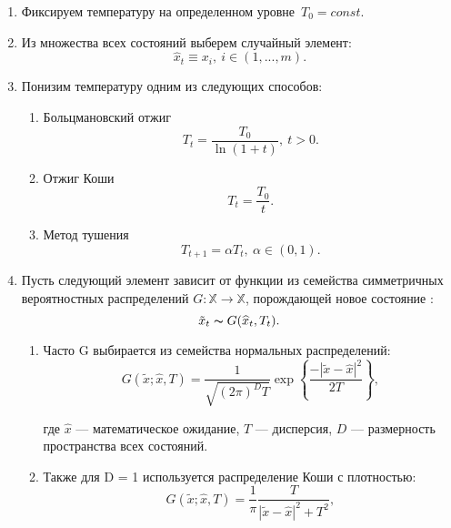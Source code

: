 \begin{enumerate}
	\item Фиксируем температуру на определенном уровне~$T_0 = const$.

	\item  Из множества всех состояний выберем случайный элемент:
	\[
		\widehat{x}_t \equiv x_i,\ i \in (1, ..., m).
	\]

	\item Понизим температуру одним из следующих способов:

		\begin{enumerate}
			\item Больцмановский отжиг
			\begin{equation}
			T_t = \dfrac{T_0}{\ln (1 + t)}, \ t > 0.
			\label{eq:boltzman}
			\end{equation}

			\item Отжиг Коши
			\begin{equation}
			T_t  =  \dfrac{T_0}{t}.
			\end{equation}

			\item Метод тушения
			\begin{equation}
			T_{t + 1} = \alpha T_t,\ \alpha \in (0, 1).
			\label{eq:tushenie}
			\end{equation}

		\end{enumerate}


	\item Пусть следующий элемент зависит от функции из семейства симметричных вероятностных распределений $G \colon \mathbb{X} \to \mathbb{X}$, порождающей новое состояние \cite{Lopatin}:
	\[
	\tilde{x}_t \thicksim G(\widehat{x}_t, T_t).
	\]

	\begin{enumerate}

		\item Часто G выбирается из семейства нормальных распределений:
		\begin{equation}
		\label{eq:normal_G}
		G(\tilde{x}; \widehat{x}, T)
		=
		\dfrac{1}
		{\sqrt{(2\pi)^{D} T}}
		\exp
		\left\lbrace
		\dfrac{- |\tilde{x} - \widehat{x}|^2}{2T}
		\right\rbrace,
		\end{equation}

		где $\widehat{x}$ — математическое ожидание, $T$  — дисперсия, $D$ — размерность пространства всех состояний.

		\item Также для D = 1 используется распределение Коши с плотностью:
		\begin{equation}
		G(\tilde{x}; \widehat{x}, T)
		=
		\dfrac{1}{\pi}
		\dfrac{T}{|\tilde{x}- \widehat{x}|^2 + T^2},
		\end{equation}


\end{enumerate}
\end{enumerate}
